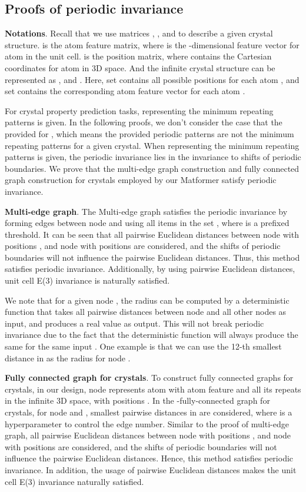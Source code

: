 \documentclass{article}
\begin{document}
\subsection{Proofs of periodic invariance}
\label{app:proof}

\textbf{Notations}. Recall that we use matrices , , and  to describe a given crystal structure.  is the atom feature matrix, where  is the -dimensional feature vector for atom  in the unit cell.
 is the position matrix, where  contains the Cartesian coordinates for atom  in 3D space.
And the infinite crystal structure can be represented as
    , 
    and 
    .
Here, set  contains all possible positions for each atom , and set  contains the corresponding atom feature vector for each atom . 

For crystal property prediction tasks,  representing the minimum repeating patterns is given. In the following proofs, we don't consider the case that the provided  for , which means the provided periodic patterns are not the minimum repeating patterns for a given crystal. When  representing the minimum repeating patterns is given, the periodic invariance lies in the invariance to  shifts of periodic boundaries. We prove that the multi-edge graph construction and fully connected graph construction for crystals employed by our Matformer satisfy periodic invariance.

\textbf{Multi-edge graph}. The Multi-edge graph satisfies the periodic invariance by forming edges between node  and  using all items in the set , where  is a prefixed threshold. It can be seen that all pairwise Euclidean distances between node  with positions , and node  with positions  are considered, and the shifts of periodic boundaries  will not influence the pairwise Euclidean distances. Thus, this method satisfies periodic invariance. Additionally, by using pairwise Euclidean distances, unit cell E(3) invariance is naturally satisfied. 

We note that for a given node , the radius can be computed by a deterministic function that takes all pairwise distances between node  and all other nodes as input, and produces a real value  as output. This will not break periodic invariance due to the fact that the deterministic function will always produce the same  for the same input . One example is that we can use the 12-th smallest distance   in  as the radius for node .

\textbf{Fully connected graph for crystals}. To construct fully connected graphs for crystals, in our design, node  represents atom with atom feature  and all its repeats in the infinite 3D space, with positions . In the -fully-connected graph for crystals, for node  and ,  smallest pairwise distances in  are considered, where  is a hyperparameter to control the edge number. Similar to the proof of multi-edge graph, all pairwise Euclidean distances between node  with positions , and node  with positions  are considered, and the shifts of periodic boundaries will not influence the pairwise Euclidean distances. Hence, this method satisfies periodic invariance. In addition, the usage of pairwise Euclidean distances makes the unit cell E(3) invariance naturally satisfied.
\end{document}
